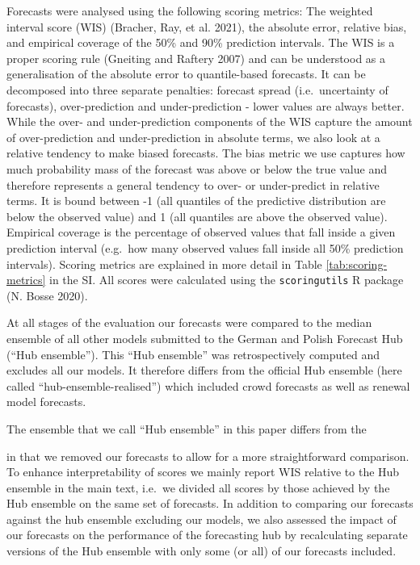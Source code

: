 \documentclass[
]{article}
\begin{document}
Forecasts were analysed using the following scoring metrics: The weighted interval score (WIS) (Bracher, Ray, et al. 2021), the absolute error, relative bias, and empirical coverage of the 50\% and 90\% prediction intervals. The WIS is a proper scoring rule (Gneiting and Raftery 2007) and can be understood as a generalisation of the absolute error to quantile-based forecasts. It can be decomposed into three separate penalties: forecast spread (i.e.~uncertainty of forecasts), over-prediction and under-prediction - lower values are always better. While the over- and under-prediction components of the WIS capture the amount of over-prediction and under-prediction in absolute terms, we also look at a relative tendency to make biased forecasts. The bias metric we use captures how much probability mass of the forecast was above or below the true value and therefore represents a general tendency to over- or under-predict in relative terms. It is bound between -1 (all quantiles of the predictive distribution are below the observed value) and 1 (all quantiles are above the observed value). Empirical coverage is the percentage of observed values that fall inside a given prediction interval (e.g.~how many observed values fall inside all 50\% prediction intervals). Scoring metrics are explained in more detail in Table \ref{tab:scoring-metrics} in the SI. All scores were calculated using the \texttt{scoringutils} R package (N. Bosse 2020).

At all stages of the evaluation our forecasts were compared to the median ensemble of all other models submitted to the German and Polish Forecast Hub (``Hub ensemble''). This ``Hub ensemble'' was retrospectively computed and excludes all our models. It therefore differs from the official Hub ensemble (here called ``hub-ensemble-realised'') which included crowd forecasts as well as renewal model forecasts.

The ensemble that we call ``Hub ensemble'' in this paper differs from the

in that we removed our forecasts to allow for a more straightforward comparison. To enhance interpretability of scores we mainly report WIS relative to the Hub ensemble in the main text, i.e.~we divided all scores by those achieved by the Hub ensemble on the same set of forecasts. In addition to comparing our forecasts against the hub ensemble excluding our models, we also assessed the impact of our forecasts on the performance of the forecasting hub by recalculating separate versions of the Hub ensemble with only some (or all) of our forecasts included.
\end{document}
